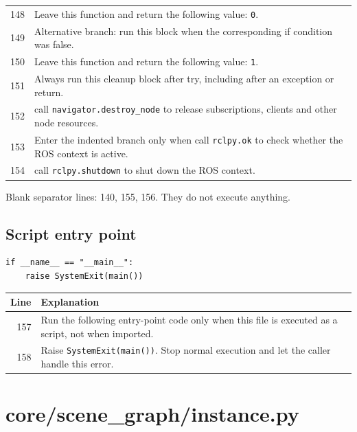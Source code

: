 \documentclass[11pt,a4paper]{book}
\begin{document}
\begin{longtable}{r p{}}
148 & Leave this function and return the following value: \texttt{0}. \\

149 & Alternative branch: run this block when the corresponding if condition was false. \\

150 & Leave this function and return the following value: \texttt{1}. \\

151 & Always run this cleanup block after try, including after an exception or return. \\

152 & call \texttt{navigator.destroy\_node} to release subscriptions, clients and other node resources. \\

153 & Enter the indented branch only when call \texttt{rclpy.ok} to check whether the ROS context is active. \\

154 & call \texttt{rclpy.shutdown} to shut down the ROS context. \\

\end{longtable}

Blank separator lines: 140, 155, 156. They do not execute anything.

\section{Script entry point}

\begin{lstlisting}[firstnumber=157]
if __name__ == "__main__":
    raise SystemExit(main())
\end{lstlisting}

\begin{longtable}{r p{}}

\textbf{Line} & \textbf{Explanation} \\ \hline \endhead

157 & Run the following entry-point code only when this file is executed as a script, not when imported. \\

158 & Raise \texttt{SystemExit(main())}. Stop normal execution and let the caller handle this error. \\

\end{longtable}

\chapter{core/scene\_graph/instance.py}
\end{document}
